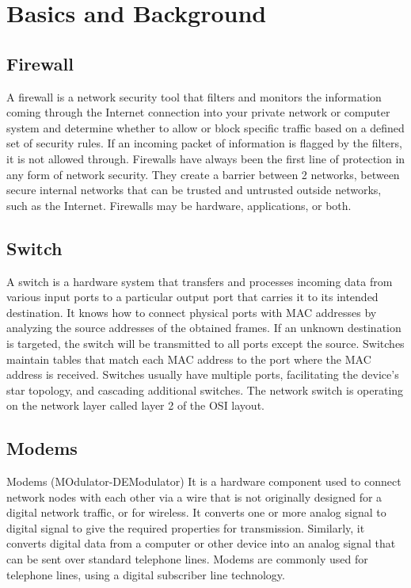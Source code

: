 \documentclass[12pt]{article}
\begin{document}
\section{Basics and Background}
\subsection{Firewall}
A firewall is a network security tool that filters and  monitors the information coming through the Internet connection into your private network or computer system and determine whether to allow or block specific traffic based on a defined set of security rules. If an incoming packet of information is flagged by the filters, it is not allowed through.
Firewalls have always been the first line of protection in any form of network security. They create a barrier between 2 networks, between secure internal networks that can be trusted and untrusted outside networks, such as the Internet. 
Firewalls may be hardware, applications, or both.\cite{3}

\subsection{Switch}
A switch is a hardware system that transfers and processes incoming data from various input ports to a particular output port that carries it to its intended destination. It knows how to connect physical ports with MAC addresses by analyzing the source addresses of the obtained frames. If an unknown destination is targeted, the switch will be transmitted to all ports except the source. Switches maintain tables that match each MAC address to the port where the MAC address is received. Switches usually have multiple ports, facilitating the device's star topology, and cascading additional switches. 
The network switch is operating on the network layer called layer 2 of the OSI layout. \cite{4}

\subsection{Modems}
Modems (MOdulator-DEModulator) It is a hardware component  used to connect network nodes with each other via a wire that is not originally designed for a digital network traffic, or for wireless. It converts one or more analog signal to digital signal to give the required properties for transmission. Similarly, it converts digital data from a computer or other device into an analog signal that can be sent over standard telephone lines. Modems are commonly used for telephone lines, using a digital subscriber line technology.
\cite{5}
\end{document}
